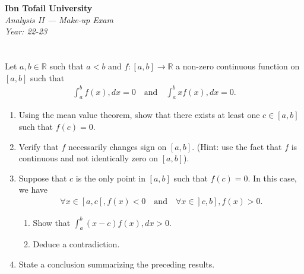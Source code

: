 \documentclass[12pt]{article}
\begin{document}
\begin{center}
  \Large\textbf{Ibn Tofail University} \\[1em]
  \large\textit{Analysis II — Make-up Exam} \\[0.5em]
  \large\textit{Year: 22-23} \\[2em]
\end{center}

\vspace{0.5cm}

\section{}
Let $a, b \in \mathbb{R}$ such that $a < b$ and $f: [a, b] \rightarrow \mathbb{R}$ a non-zero continuous function on $[a, b]$ such that
\begin{align*}
\int_a^b f(x) , dx = 0 \quad \text{and} \quad \int_a^b x f(x) , dx = 0.
\end{align*}
\begin{enumerate}
\item Using the mean value theorem, show that there exists at least one $c \in [a, b]$ such that $f(c) = 0$.
\item Verify that $f$ necessarily changes sign on $[a, b]$. (Hint: use the fact that $f$ is continuous and not identically zero on $[a, b]$).
\item Suppose that $c$ is the only point in $[a, b]$ such that $f(c) = 0$. In this case, we have
\begin{align*}
\forall x \in [a, c[, f(x) < 0 \quad \text{and} \quad \forall x \in ]c, b], f(x) > 0.
\end{align*}
\begin{enumerate}
\item Show that $\int_a^b (x-c)f(x) , dx > 0$.
\item Deduce a contradiction.
\end{enumerate}
\item State a conclusion summarizing the preceding results.
\end{enumerate}

\newpage
\end{document}
